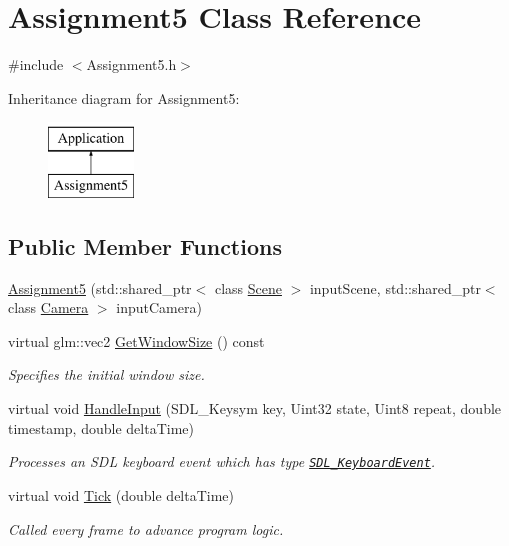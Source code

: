 \hypertarget{class_assignment5}{}\section{Assignment5 Class Reference}
\label{class_assignment5}


{\ttfamily \#include $<$Assignment5.\+h$>$}

Inheritance diagram for Assignment5\+:\begin{figure}[H]
\begin{center}
\leavevmode
\includegraphics[height=2.000000cm]{class_assignment5}
\end{center}
\end{figure}
\subsection*{Public Member Functions}
\begin{DoxyCompactItemize}
\item 
\hyperlink{class_assignment5_aee966f6188c377fd831e6edb97d1ee08}{Assignment5} (std\+::shared\+\_\+ptr$<$ class \hyperlink{class_scene}{Scene} $>$ input\+Scene, std\+::shared\+\_\+ptr$<$ class \hyperlink{class_camera}{Camera} $>$ input\+Camera)
\item 
virtual glm\+::vec2 \hyperlink{class_assignment5_ac199b6149ffa3dbedc7e0d49bb24c628}{Get\+Window\+Size} () const
\begin{DoxyCompactList}\small\item\em Specifies the initial window size. \end{DoxyCompactList}\item 
virtual void \hyperlink{class_assignment5_aab8f8440144665db9aafd7ca1cf55cff}{Handle\+Input} (S\+D\+L\+\_\+\+Keysym key, Uint32 state, Uint8 repeat, double timestamp, double delta\+Time)
\begin{DoxyCompactList}\small\item\em Processes an S\+DL keyboard event which has type \href{https://wiki.libsdl.org/SDL_KeyboardEvent}{\tt S\+D\+L\+\_\+\+Keyboard\+Event}. \end{DoxyCompactList}\item 
virtual void \hyperlink{class_assignment5_a34cdf7bc962c3a0e3959c77a24c54d79}{Tick} (double delta\+Time)
\begin{DoxyCompactList}\small\item\em Called every frame to advance program logic. \end{DoxyCompactList}\end{DoxyCompactItemize}
